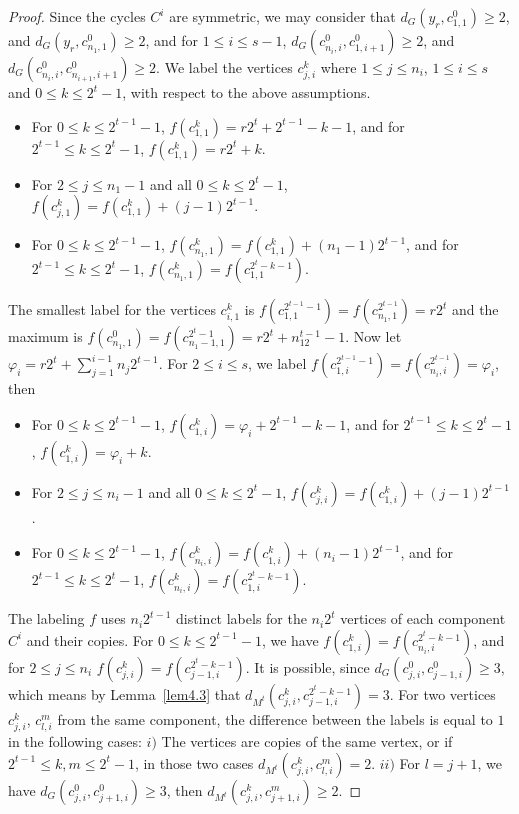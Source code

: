 \documentclass{article}
\newtheorem{open problem} {Open Problem}
\numberwithin{lemma}{section}
\numberwithin{theorem}{section}
\numberwithin{cor}{section}
\numberwithin{prop}{section}
\numberwithin{con}{section}
\numberwithin{claim}{section}
\numberwithin{obs}{section}
\numberwithin{dnt}{section}
\begin{document}
\begin{proof}
	Since the cycles $C^i$ are symmetric, we may consider that $d_G(y_r,c^0_{1,1})\geq 2$, and $d_G(y_r,c^0_{n_1,1})\geq 2$, and for $1\leq i \leq s-1$,  $d_G(c^0_{n_i,i},c^0_{1,i+1})\geq 2$, and $d_G(c^0_{n_i,i},c^0_{n_{i+1},i+1})\geq 2$. We label the vertices $c^k_{j,i}$ where  $1\leq j\leq n_i$, $1\leq i\leq s$ and $0\leq k\leq 2^t-1$, with respect to the above assumptions. 
	\begin{itemize}
		\item For $0\leq k \leq 2^{t-1}-1$, $f(c^k_{1,1})=r2^t+2^{t-1}-k-1$, and for $2^{t-1}\leq k \leq 2^t-1$,  $f(c^k_{1,1})=r2^t+k$. 
		\item For $2\leq j \leq n_1-1$ and all $0\leq k \leq 2^t-1$, $f(c^k_{j,1})=f(c^k_{1,1})+(j-1)2^{t-1}$.
		\item For $0 \leq k \leq 2^{t-1}-1$, $f(c^k_{n_1,1})=f(c^k_{1,1})+(n_1-1)2^{t-1}$, and for $2^{t-1}\leq k \leq 2^t-1$,   $f(c^k_{n_1,1})=f(c^{2^t-k-1}_{1,1})$.	
	\end{itemize}	
	\par
	The smallest label for the vertices $c^k_{i,1}$ is $f(c^{2^{t-1}-1}_{1,1})=f(c^{2^{t-1}}_{n_1,1})=r2^t$ and the maximum is $f(c^0_{n_1,1})=f(c^{2^t-1}_{n_1-1,1})=r2^t+n_12^{t-1}-1$.  Now let $\varphi_i=r2^t+\sum_{j=1}^{i-1}n_j2^{t-1}$. For $2\leq i\leq s$, we label $f(c^{2^{t-1}-1}_{1,i})=f(c^{2^{t-1}}_{n_i,i})=\varphi_i$, then
	\begin{itemize}
		\item For $0\leq k \leq 2^{t-1}-1$, $f(c^k_{1,i})=\varphi_i+2^{t-1}-k-1$, and for $2^{t-1}\leq k \leq 2^t-1$, $f(c^k_{1,i})=\varphi_i+k$.
		\item For $2\leq j \leq n_i-1$ and all $0\leq k \leq 2^t-1$, $f(c^k_{j,i})=f(c^k_{1,i})+(j-1)2^{t-1}$.\par     
		\item For  $0 \leq k \leq 2^{t-1}-1$, 	 $f(c^k_{n_i,i})=f(c^k_{1,i})+(n_i-1)2^{t-1}$, and for $2^{t-1}\leq k \leq 2^t-1$,  $f(c^k_{n_i,i})=f(c^{2^t-k-1}_{1,i})$.	
	\end{itemize}	
	\par
	The labeling $f$ uses $n_i2^{t-1}$ distinct labels for the $n_i2^t$ vertices of each component $C^i$ and their copies. For $0 \leq k \leq 2^{t-1}-1$, we have $f(c^k_{1,i})=f(c^{2^t-k-1}_{n_i,i})$, and for $2\leq j\leq n_i$ $f(c^k_{j,i})=f(c^{2^t-k-1}_{j-1,i})$. It is possible, since $d_G(c^0_{j,i},c^0_{j-1,i})\geq 3$, which means by Lemma~\ref{lem4.3} that $d_{M^t}(c^k_{j,i},c^{2^t-k-1}_{j-1,i})=3$. For two vertices  $c^k_{j,i}$, $c^m_{l,i}$ from the same component,  the difference between the labels is equal to $1$ in the following cases: $i)$ The vertices are copies of the same vertex, or if $ 2^{t-1}\leq k,m\leq 2^t-1$, in those two cases $d_{M^t}(c^k_{j,i},c^m_{l,i})=2$.  $ii)$  For $l=j+1$, we have $d_G(c^0_{j,i},c^0_{j+1,i})\geq 3$, then  $d_{M^t}(c^k_{j,i},c^m_{j+1,i})\geq 2$. 

\end{proof}
\end{document}
